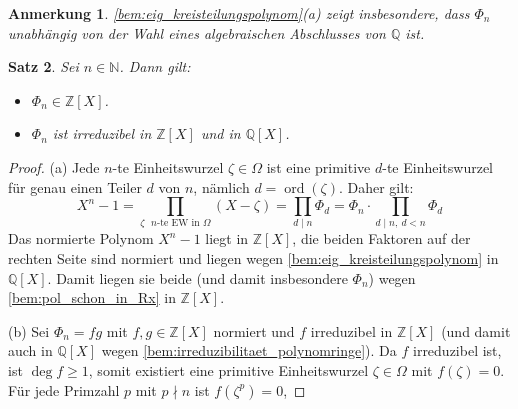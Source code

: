 \documentclass[a4paper, twoside, 11pt, ngerman]{report}
\newcommand{\NN}{\mathds N}
\newcommand{\QQ}{\mathds Q}
\newcommand{\ZZ}{\mathds Z}
\theoremstyle{definistyle}
\newtheorem{satz}{Satz}[section]
\newtheorem{anm}[satz]{Anmerkung}
\theoremstyle{remark}
\begin{document}
\begin{anm}
\ref{bem:eig_kreisteilungspolynom}(a) zeigt insbesondere, dass $\Phi_n$ unabhängig von der Wahl eines algebraischen Abschlusses von $\QQ$ ist.
\end{anm}

\begin{satz}\label{satz:irreduzibilitaet_kreisteilungspoly}
Sei $n \in \NN$. Dann gilt:
\begin{itemize}
    \item[(a)] $\Phi_n \in \ZZ[X]$.
    \item[(b)] $\Phi_n$ ist irreduzibel in $\ZZ[X]$ und in $\QQ[X]$.
\end{itemize}
\end{satz}
\begin{proof}
(a) Jede $n$-te Einheitswurzel $\zeta \in \Omega$ ist eine primitive $d$-te Einheitswurzel für genau einen Teiler $d$ von $n$, nämlich $d = \operatorname{ord}(\zeta)$. Daher gilt:
\[
X^n - 1 = \prod_{\zeta \text{ $n$-te EW in }\Omega} (X - \zeta) = \prod_{d \mid n} \Phi_d
= \Phi_n \cdot \prod_{d \mid n, \ d<n} \Phi_d
\]
Das normierte Polynom $X^n-1$ liegt in $\ZZ[X]$, die beiden Faktoren auf der rechten Seite sind normiert und liegen wegen \ref{bem:eig_kreisteilungspolynom} in $\QQ[X]$.
Damit liegen sie beide (und damit insbesondere $\Phi_n$) wegen \ref{bem:pol_schon_in_Rx}
in $\ZZ[X]$.

(b) Sei $\Phi_n = f g$ mit $f, g \in \ZZ[X]$ normiert und $f$ irreduzibel in $\ZZ[X]$
(und damit auch in $\QQ[X]$ wegen \ref{bem:irreduzibilitaet_polynomringe}).
Da $f$ irreduzibel ist, ist $\deg f\geq 1$, somit existiert eine primitive Einheitswurzel
$\zeta\in\Omega$ mit $f(\zeta)=0$. Für jede Primzahl $p$ mit $p\nmid n$ ist $f(\zeta^p) = 0$, 


\end{proof}
\end{document}
